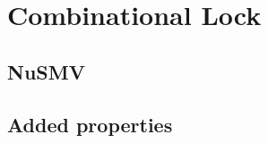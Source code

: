 \documentclass[11pt]{article}
\begin{document}


\section{Combinational Lock}
	\subsection{NuSMV}
	\subsection{Added properties}
	
%	
%
%		
%	
\end{document}
